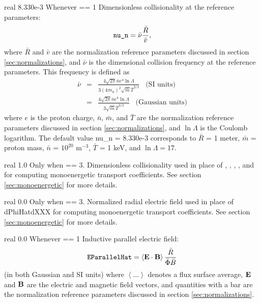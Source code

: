 \myhrule

{real}
{8.330e-3}
{Whenever  == 1}
{Dimensionless collisionality at the reference parameters:
\begin{equation}
\mbox{\ttfamily nu\_n} = \bar{\nu} \frac{\bar{R}}{\bar{v}},
\end{equation}
where $\bar{R}$ and $\bar{v}$ are the normalization reference parameters discussed in section \ref{sec:normalizations},
and $\bar{\nu}$ is the dimensional collision frequency at the reference parameters. This frequency is defined as
\begin{eqnarray}
\bar{\nu}
&=& \frac{4\sqrt{2\pi} \bar{n} e^4 \ln\Lambda}{3 (4\pi\epsilon_0)^2 \sqrt{\bar{m}} \bar{T}^{3/2}} \;\;\; \mbox{(SI units}) \\
&=& \frac{4\sqrt{2\pi} \bar{n} e^4 \ln\Lambda}{3 \sqrt{\bar{m}} \bar{T}^{3/2}} \;\;\; \mbox{(Gaussian units}) \nonumber
\end{eqnarray}
where $e$ is the proton charge, $\bar{n}$, $\bar{m}$, and $\bar{T}$ are the normalization reference parameters discussed in section \ref{sec:normalizations},
and $\ln\Lambda$ is the Coulomb logarithm.
The default value {\ttfamily nu\_n} = 8.330e-3 corresponds to $\bar{R}$ = 1 meter,
$\bar{m}$ = proton mass, $\bar{n}$ = $10^{20}$ m$^{-3}$, $\bar{T}$ = 1 keV, and $\ln\Lambda = 17$.
}

\myhrule

{real}
{1.0}
{Only when  == 3.}
{Dimensionless collisionality used in place of , , , , and  for computing monoenergetic transport coefficients.
See section \ref{sec:monoenergetic} for more details.}

\myhrule

{real}
{0.0}
{Only when  == 3.}
{Normalized radial electric field used in place of {\ttfamily dPhiHatdXXX} for computing monoenergetic transport coefficients.
See section \ref{sec:monoenergetic} for more details.}

\myhrule

{real}
{0.0}
{Whenever  == 1}
{Inductive parallel electric field:
\begin{equation}
\mbox{\ttfamily EParallelHat} = \left< {\mathbf E}\cdot{\mathbf B}\right> \frac{\bar{R}}{\bar{\Phi}\bar{B}}
\end{equation}
(in both Gaussian and SI units) where $\left< \ldots \right>$ denotes a flux surface average,
${\mathbf E}$ and ${\mathbf B}$ are the electric and magnetic field vectors, and 
quantities with a bar are the normalization reference parameters discussed in section \ref{sec:normalizations}.}

